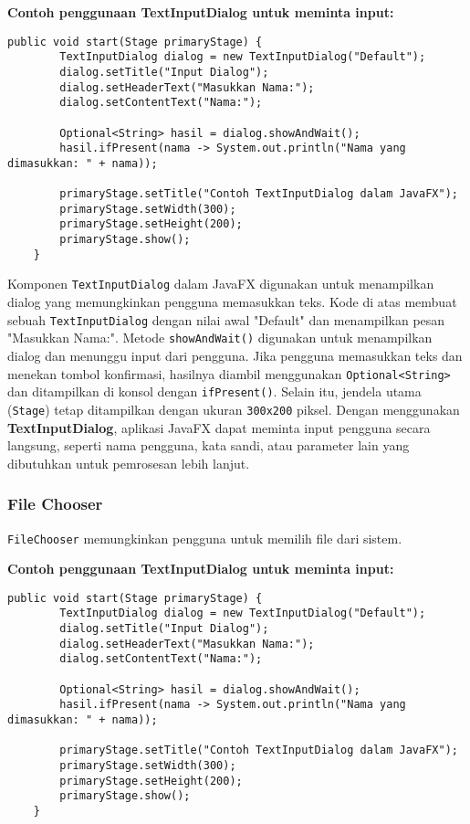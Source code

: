 \textbf{Contoh penggunaan TextInputDialog untuk meminta input:}
\begin{lstlisting}[style=JavaStyle, caption=Menggunakan TextInputDialog]
	public void start(Stage primaryStage) {
		TextInputDialog dialog = new TextInputDialog("Default");
		dialog.setTitle("Input Dialog");
		dialog.setHeaderText("Masukkan Nama:");
		dialog.setContentText("Nama:");
		
		Optional<String> hasil = dialog.showAndWait();
		hasil.ifPresent(nama -> System.out.println("Nama yang dimasukkan: " + nama));
		
		primaryStage.setTitle("Contoh TextInputDialog dalam JavaFX");
		primaryStage.setWidth(300);
		primaryStage.setHeight(200);
		primaryStage.show();
	}
\end{lstlisting}

Komponen \texttt{TextInputDialog} dalam JavaFX digunakan untuk menampilkan dialog yang memungkinkan pengguna memasukkan teks. Kode di atas membuat sebuah \texttt{TextInputDialog} dengan nilai awal "Default" dan menampilkan pesan "Masukkan Nama:". Metode \texttt{showAndWait()} digunakan untuk menampilkan dialog dan menunggu input dari pengguna. Jika pengguna memasukkan teks dan menekan tombol konfirmasi, hasilnya diambil menggunakan \texttt{Optional<String>} dan ditampilkan di konsol dengan \texttt{ifPresent()}. Selain itu, jendela utama (\texttt{Stage}) tetap ditampilkan dengan ukuran \texttt{300x200} piksel. Dengan menggunakan \textbf{TextInputDialog}, aplikasi JavaFX dapat meminta input pengguna secara langsung, seperti nama pengguna, kata sandi, atau parameter lain yang dibutuhkan untuk pemrosesan lebih lanjut.


\subsubsection{File Chooser}

\texttt{FileChooser} memungkinkan pengguna untuk memilih file dari sistem.

\textbf{Contoh penggunaan TextInputDialog untuk meminta input:}
\begin{lstlisting}[style=JavaStyle, caption=Menggunakan TextInputDialog]
	public void start(Stage primaryStage) {
		TextInputDialog dialog = new TextInputDialog("Default");
		dialog.setTitle("Input Dialog");
		dialog.setHeaderText("Masukkan Nama:");
		dialog.setContentText("Nama:");
		
		Optional<String> hasil = dialog.showAndWait();
		hasil.ifPresent(nama -> System.out.println("Nama yang dimasukkan: " + nama));
		
		primaryStage.setTitle("Contoh TextInputDialog dalam JavaFX");
		primaryStage.setWidth(300);
		primaryStage.setHeight(200);
		primaryStage.show();
	}
\end{lstlisting}

